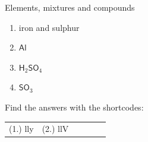 \begin{exercises}{Elements, mixtures and compounds}
{\begin{enumerate}[noitemsep, label=\textbf{\arabic*}. ]
\begin{enumerate}[noitemsep, label=\textbf{\alph*}. ]
\label{m38708*uid31}\item iron and sulphur
\label{m38708*uid32}\item $\mathsf{Al}$
\label{m38708*uid33}\item $\mathsf{H}{}_{2}\mathsf{SO}{}_{4}$\label{m38708*uid34}\item $\mathsf{SO}{}_{3}$\end{enumerate}
                \end{enumerate}
    \label{m38708*cid4}
\par {} Find the answers with the shortcodes:
 \par \begin{tabular}[h]{cccccc}
 (1.) lly  &  (2.) llV  & \end{tabular}}
\end{exercises}
